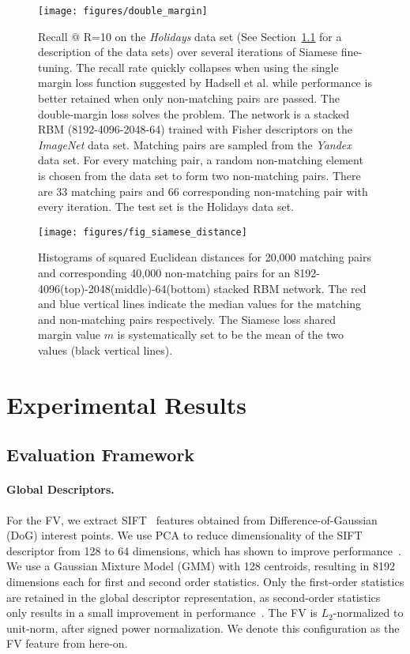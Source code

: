 \documentclass[10pt,twocolumn,letterpaper]{article}
\begin{document}
\begin{figure}
	\centering
		\texttt{[image: figures/double\_margin]}
		\caption{\footnotesize Recall @ R=10 on the {\it Holidays} data set (See Section~\ref{sec:eval_framework} for a description of the data sets) over several iterations of Siamese fine-tuning.
The recall rate quickly collapses when using the single margin loss function suggested by Hadsell et al. \cite{Siamese} while performance is better retained when only non-matching pairs are passed.
The double-margin loss solves the problem.
The network is a stacked RBM (8192-4096-2048-64) trained with Fisher descriptors on the {\it ImageNet} data set. Matching pairs are sampled from the {\it Yandex} data set. 
For every matching pair, a random non-matching element is chosen from the data set to form two non-matching pairs.
There are 33 matching pairs and 66 corresponding non-matching pair with every iteration.
The test set is the Holidays data set. 
}
	
	\label{fig:margin3}
\end{figure}

\begin{figure}
	\centering
		\texttt{[image: figures/fig\_siamese\_distance]}
		\caption{\footnotesize Histograms of squared Euclidean distances for 20,000 matching pairs  and corresponding 40,000 non-matching pairs for an 8192-4096(top)-2048(middle)-64(bottom) stacked RBM network. 
The red and blue vertical lines indicate the median values for the matching and non-matching pairs respectively.
The Siamese loss shared margin value $m$ is systematically set to be the mean of the two values (black vertical lines).}
	
	\label{fig:margin2}
\end{figure}

\section{Experimental Results}
\label{sec:exp}



\subsection{Evaluation Framework}
\label{sec:eval_framework}


\paragraph{Global Descriptors.}
For the FV, we extract SIFT~\cite{Lowe04} features obtained from Difference-of-Gaussian (DoG) interest points.  
We use PCA to reduce dimensionality of the SIFT descriptor from 128 to 64 dimensions, which has shown to improve performance~\cite{Jegou_CVPR_10}.
We use a Gaussian Mixture Model (GMM) with 128 centroids, resulting in 8192 dimensions each for first and second order statistics.
Only the first-order statistics are retained in the global descriptor representation, as second-order statistics only results in a small improvement in performance~\cite{SFCV}.
The FV is $L_2$-normalized to unit-norm, after signed power normalization.
We denote this configuration as the FV feature from here-on.
\end{document}
